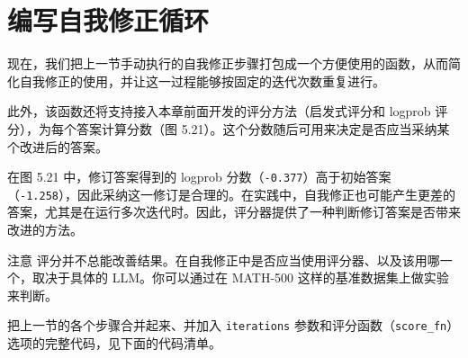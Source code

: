 \section{编写自我修正循环}

现在，我们把上一节手动执行的自我修正步骤打包成一个方便使用的函数，从而简化自我修正的使用，并让这一过程能够按固定的迭代次数重复进行。

此外，该函数还将支持接入本章前面开发的评分方法（启发式评分和 logprob 评分），为每个答案计算分数（图 5.21）。这个分数随后可用来决定是否应当采纳某个改进后的答案。


在图 5.21 中，修订答案得到的 logprob 分数（\texttt{-0.377}）高于初始答案（\texttt{-1.258}），因此采纳这一修订是合理的。在实践中，自我修正也可能产生更差的答案，尤其是在运行多次迭代时。因此，评分器提供了一种判断修订答案是否带来改进的方法。

\begin{myWarning}{注意}
 评分并不总能改善结果。在自我修正中是否应当使用评分器、以及该用哪一个，取决于具体的 LLM。你可以通过在 MATH-500 这样的基准数据集上做实验来判断。\end{myWarning}

把上一节的各个步骤合并起来、并加入 \texttt{iterations} 参数和评分函数（\texttt{score\_fn}）选项的完整代码，见下面的代码清单。


